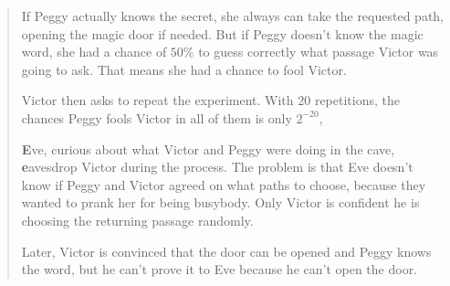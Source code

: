 \begin{quote}
	If Peggy actually knows the secret, she always can take the requested path, opening the magic door if needed.
	But if Peggy doesn't know the magic word, she had a chance of $50\%$ to guess correctly what passage Victor was going to ask. That means she had a chance to fool Victor.
	
	Victor then asks to repeat the experiment. With $20$ repetitions, the chances Peggy fools Victor in all of them is only  $2^{-20}$,
	
	\textbf{E}ve, curious about what Victor and Peggy were doing in the cave, \textbf{e}avesdrop Victor during the process. The problem is that Eve doesn't know if Peggy and Victor agreed on what paths to choose, because they wanted to prank her for being busybody. Only Victor is confident he is choosing the returning passage randomly.
	
	Later, Victor is convinced that the door can be opened and Peggy knows the word, but he can't prove it to Eve because he can't open the door. 
\end{quote}





